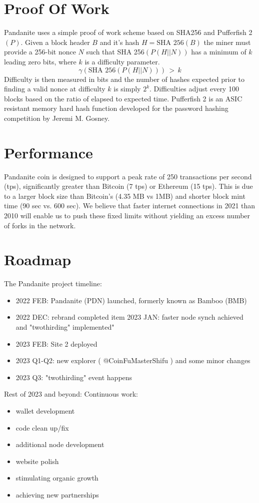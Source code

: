 \documentclass[11pt, a4paper]{elegantpaper}
\begin{document}
\section{ Proof Of Work}
Pandanite uses a simple proof of work scheme based on SHA256 and Pufferfish 2 $(P)$. Given a block
header $B$ and it’s hash $H = \text{SHA 256}(B)$ the miner must provide a 256-bit nonce $N$ such that
SHA 256$(P(H||N))$ has a minimum of $k$ leading zero bits, where $k$ is a difficulty parameter.
\begin{equation}
\gamma(\text{SHA 256}(P(H||N)))\,>\,k
\end{equation}
Difficulty is then measured in bits and the number of hashes expected prior to finding a valid nonce at difficulty $k$ is simply $2^k$. Difficulties adjust every 100 blocks based on the ratio of elapsed to expected time. Pufferfish 2 is an ASIC resistant memory hard hash function developed for the password hashing competition by Jeremi M. Gosney.
\section{Performance}
Pandanite coin is designed to support a peak rate of 250 transactions per second (tps), significantly
greater than Bitcoin (7 tps) or Ethereum (15 tps). This is due to a larger block size than Bitcoin’s
(4.35 MB vs 1MB) and shorter block mint time (90 sec vs. 600 sec). We believe that faster internet
connections in 2021 than 2010 will enable us to push these fixed limits without yielding an excess
number of forks in the network.
\section{ Roadmap}
The Pandanite project timeline:
\begin{itemize}
	 \item 2022 FEB: Pandanite (PDN) launched, formerly known as Bamboo (BMB)
	\item 2022 DEC: rebrand completed 
	item 2023 JAN: faster node synch achieved and "twothirding" implemented"
	\item 2023 FEB: Site 2 deployed
	\item 2023 Q1-Q2: new explorer ( @CoinFuMasterShifu ) and some minor changes
	\item 2023 Q3: "twothirding" event happens
\end{itemize}
Rest of 2023 and beyond:
Continuous work:
\begin{itemize}
\item wallet development
\item code clean up/fix
\item additional node development
\item website polish
\item stimulating organic growth
\item achieving new partnerships
\end{itemize}
\end{document}
